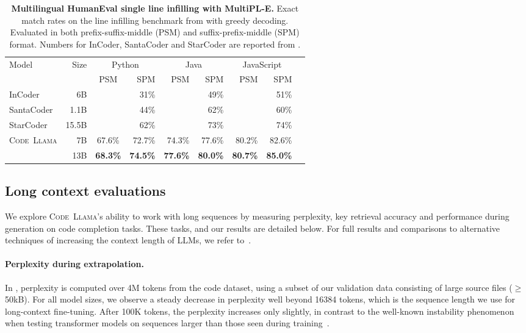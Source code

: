\documentclass[10pt]{article}
\newcommand{\model}{\textsc{Code~Llama}\xspace}
\newcommand*{\acc}[1]{\num[round-mode=places,round-precision=1]{#1}\%}
\begin{document}
\begin{table}[t!]
    \center
    \setlength{\tabcolsep}{3pt}
    \begin{tabular}{lrcrrrrrr}
    \toprule
    Model & Size & \multicolumn{2}{c}{Python} &\multicolumn{2}{c}{Java} & \multicolumn{2}{c}{JavaScript}  \\ 
    && PSM & SPM & PSM & SPM & PSM & SPM\\
    \midrule
    InCoder &6B && \acc{31} & & \acc{49} & & \acc{51} &  \\
    SantaCoder &1.1B && \acc{44} & & \acc{62} & & \acc{60} & \\
    StarCoder &15.5B && \acc{62} & & \acc{73} & & \acc{74} & \\
    \midrule
    \multirow{ 2}{*}{\model} & 7B & \acc{67.6} & \acc{72.7} & \acc{74.3} & \acc{77.6} & \acc{80.2} & \acc{82.6} \\
    \cmidrule{2-9}
    & 13B & \textbf{\acc{68.3}} & \textbf{\acc{74.5}} & \textbf{\acc{77.6}} & \textbf{\acc{80.0}} & \textbf{\acc{80.7}} & \textbf{\acc{85.0}} \\
    \bottomrule
    \end{tabular}
    \caption{\textbf{Multilingual HumanEval single line infilling with MultiPL-E.} Exact match rates on the line infilling benchmark from \citet{allal2023santacoder} with greedy decoding. Evaluated in both prefix-suffix-middle (PSM) and suffix-prefix-middle (SPM) format. Numbers for InCoder, SantaCoder and StarCoder are reported from \citet{li2023starcoder}.}
    \label{tab:he-fim-santa}
\end{table}
 
\subsection{Long context evaluations}
\label{sec:results-lcft}
We explore \model's ability to work with long sequences by measuring perplexity, key retrieval accuracy and performance during generation on code completion tasks. These tasks, and our results are detailed below. 
For full results and comparisons to alternative techniques of increasing the context length of LLMs, we refer to~.

\paragraph{Perplexity during extrapolation.} In , perplexity is computed over 4M tokens from the code dataset, using a subset of our validation data consisting of large source files ($\ge$50kB).
For all model sizes, we observe a steady decrease in perplexity well beyond 16384 tokens, which is the sequence length we use for long-context fine-tuning.
After 100K tokens, the perplexity increases only slightly, in contrast to the well-known instability phenomenon when testing transformer models on sequences larger than those seen during training~\citep{press2021train}.
\end{document}
